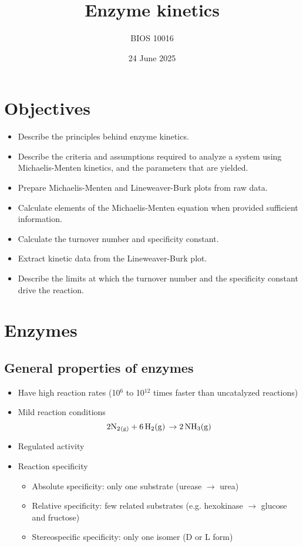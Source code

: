 \documentclass[letterpaper, 12pt]{article}
\title{Enzyme kinetics}
\author{BIOS 10016}
\date{24 June 2025}
\begin{document}
\maketitle

\section*{Objectives}

\begin{itemize}
\item Describe the principles behind enzyme kinetics.
\item Describe the criteria and assumptions required to analyze a system using Michaelis-Menten kinetics, and the parameters that are yielded.
\item Prepare Michaelis-Menten and Lineweaver-Burk plots from raw data.
\item Calculate elements of the Michaelis-Menten equation when provided sufficient information.
\item Calculate the turnover number and specificity constant.
\item Extract kinetic data from the Lineweaver-Burk plot.
\item Describe the limits at which the turnover number and the specificity constant drive the reaction.
\end{itemize}

\newpage

\section*{Enzymes}

\subsection*{General properties of enzymes}

\begin{itemize}
\item Have high reaction rates (10$^6$ to 10$^{12}$ times faster than uncatalyzed reactions)
\item Mild reaction conditions $$2\ce{N2_{(g)} + 6\ce{H2(g)} \to \ce{2NH3(g)}}$$
\item Regulated activity
\item Reaction specificity
\begin{itemize}
\item Absolute specificity: only one substrate (urease $\to$ urea)
\item Relative specificity: few related substrates (e.g. hexokinase $\to$ glucose and fructose)
\item Stereospecific specificity: only one isomer (D or L form)
\end{itemize}
\end{itemize}
\end{document}
